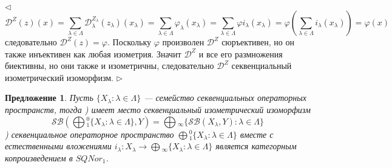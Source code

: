 \documentclass[12pt]{article}
\newtheorem{proposition}[theorem]{Предложение}
\newenvironment{proof}{\par $\triangleleft$}{$\triangleright$}
\begin{document}
\begin{proof}
$$
\mathcal{D}^{Z}(z)(x)
=\sum_{\lambda\in\Lambda}\mathcal{D}_\lambda^{Z_\lambda}(z_\lambda)(x_\lambda)
=\sum_{\lambda\in\Lambda}\varphi_\lambda(x_\lambda)
=\sum_{\lambda\in\Lambda}\varphi i_\lambda(x_\lambda)
=\varphi\left(\sum_{\lambda\in\Lambda} i_\lambda(x_\lambda)\right)
=\varphi(x)
$$
следовательно $\mathcal{D}^Z(z)=\varphi$. Поскольку $\varphi$ произволен $\mathcal{D}^Z$ сюръективен, но он также инъективен как любая изометрия. Значит $\mathcal{D}^Z$ и все его размножения биективны, но они также и изометричны, следовательно $\mathcal{D}^Z$ секвенциальный изометрический изоморфизм.
\end{proof}

\begin{proposition}\label{PrSQCoProdUnivProp} Пусть $\{X_\lambda:\lambda\in \Lambda\}$ ---  семейство секвенциальных операторных пространств, тогда
) имеет место секвенциальный изометрический изоморфизм
$$
\mathcal{SB}\left(\bigoplus{}_1^0\{X_\lambda:\lambda\in\Lambda\},Y\right)
=\bigoplus{}_\infty\{\mathcal{SB}(X_\lambda,Y):\lambda\in\Lambda\}
$$
) секвенциальное операторное пространство $\bigoplus{}_1^0\{X_\lambda:\lambda\in\Lambda\}$ вместе с естественными вложениями $i_\lambda:X_\lambda\to\bigoplus{}_\infty\{X_\lambda:\lambda\in\Lambda\}$ является категорным копроизведением в $SQNor_1$.
\end{proposition}
\end{document}
